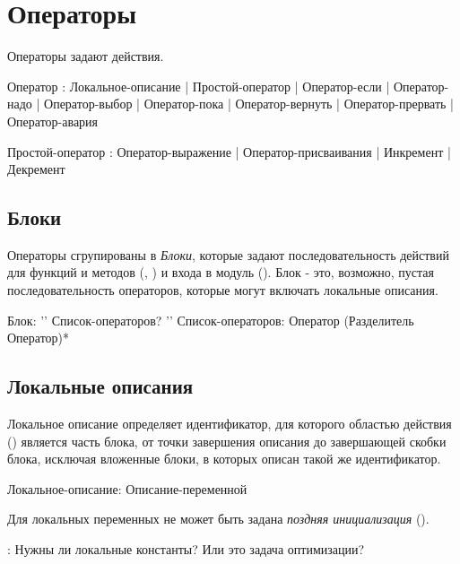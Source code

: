 \hypertarget{statements}{%
\section{Операторы}\label{stmt:chapter}}

Операторы задают действия.

\begin{Grammar}
Оператор
    : Локальное-описание
    | Простой-оператор
    | Оператор-если
    | Оператор-надо
    | Оператор-выбор
    | Оператор-пока
    | Оператор-вернуть
    | Оператор-прервать
    | Оператор-авария

Простой-оператор
    : Оператор-выражение 
    | Оператор-присваивания
    | Инкремент 
    | Декремент
\end{Grammar}

\hypertarget{blocks}{%
\subsection{Блоки}\label{stmt:blocks}}

Операторы сгрупированы в \emph{Блоки}, которые задают последовательность действий для функций и методов (, ) и входа в модуль ().
Блок - это, возможно, пустая последовательность операторов, которые могут включать локальные описания.


\begin{Grammar}
Блок: '{' Список-операторов? '}'
Список-операторов: Оператор (Разделитель Оператор)* 
\end{Grammar}

\hypertarget{local-decls}{%
\subsection{Локальные описания}\label{stmt:local-decls}}

Локальное описание определяет идентификатор, для которого областью действия () является часть блока, 
от точки завершения описания до завершающей скобки блока, исключая вложенные блоки, в которых описан такой же идентификатор.

\begin{Grammar}
Локальное-описание: Описание-переменной
\end{Grammar}

Для локальных переменных не может быть задана \emph{поздняя инициализация} ().

\TBD: Нужны ли локальные константы? Или это задача оптимизации?

